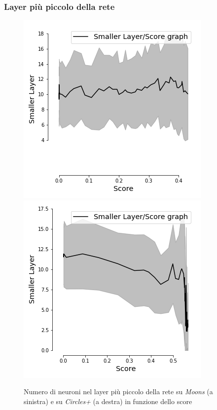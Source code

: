 \documentclass{beamer}
\begin{document}
\begin{frame}
 \frametitle{Layer più piccolo della rete }
    \begin{figure}
    \includegraphics[scale = 0.42]{images/small_Score_moons.png}
    \includegraphics[scale = 0.42]{images/small_Score_circles+.png}
    \caption{\large Numero di neuroni nel layer più piccolo della rete su \textit{Moons} (a sinistra) e su \textit{Circles+} (a destra) in funzione dello score}
 \end{figure}
\end{frame}
\end{document}
